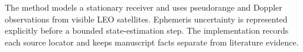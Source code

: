 The method models a stationary receiver and uses pseudorange and Doppler observations from visible LEO satellites. Ephemeris uncertainty is represented explicitly before a bounded state-estimation step. The implementation records each source locator and keeps manuscript facts separate from literature evidence.
